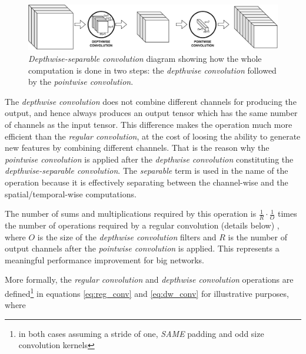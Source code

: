 \begin{figure}[ht]
	\centering
	\includegraphics[width=1\linewidth]{kws/images/dws_conv_new}
	\caption[\textit{Depthwise-separable convolution} diagram]{\textit{Depthwise-separable convolution} diagram showing how the whole computation is done in two steps: the \textit{depthwise convolution} followed by the \textit{pointwise convolution}.}
	\label{fig:dwsconv}
\end{figure}



The \textit{depthwise convolution} does not combine different channels for producing the output, and hence always produces an output tensor which has the same number of channels as the input tensor. This difference makes the operation much more efficient than the \textit{regular convolution}, at the cost of loosing the ability to generate new features by combining different channels. That is the reason why the \textit{pointwise convolution} is applied after the \textit{depthwise convolution} constituting the \textit{depthwise-separable convolution}. The \textit{separable} term is used in the name of the operation because it is effectively separating between the channel-wise and the spatial/temporal-wise computations. 

The number of sums and multiplications required by this operation is $\frac{1}{R} \cdot \frac{1}{O}$ times the number of operations required by a regular convolution (details below)  \autocite{howard2017}, where $O$ is the size of the \textit{depthwise convolution} filters and $R$ is the number of output channels after the \textit{pointwise convolution} is applied. This represents a meaningful performance improvement for big networks.

More formally, the \textit{regular convolution} and \textit{depthwise convolution} operations \autocite{howard2017}  are defined\footnote{in both cases assuming a stride of one, \textit{SAME} padding and odd size convolution kernels} in equations \ref{eq:reg_conv} and  \ref{eq:dw_conv} for illustrative purposes, where

